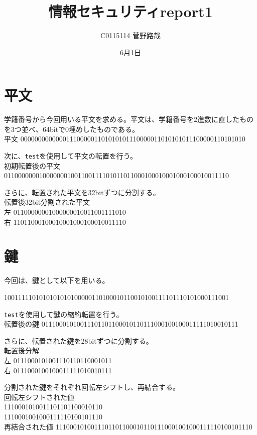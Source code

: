 \documentclass[uplatex]{jsarticle}
\title{情報セキュリティreport1}
\author{C0115114 菅野路哉}
\date{6月1日}
\begin{document}
\maketitle

\section{平文}
学籍番号から今回用いる平文を求める。平文は、学籍番号を2進数に直したものを3つ並べ、64bitで0埋めしたものである。\\
平文
0000000000000111000001101010101110000011010101011100000110101010


次に、{\tt test}を使用して平文の転置を行う。\\
初期転置後の平文
0110000000100000001001100111101011011000100010001000100010011110


さらに、転置された平文を32bitずつに分割する。\\
転置後32bit分割された平文\\
左 01100000001000000010011001111010\\
右 11011000100010001000100010011110


\section{鍵}
今回は、鍵として以下を用いる。


1001111101010101010100000110100010110010100111101110101000111001


{\tt test}を使用して鍵の縮約転置を行う。\\
転置後の鍵
01110001010011101101100010110111000100100011111010010111


さらに、転置された鍵を28bitずつに分割する。\\
転置後分解\\
左 0111000101001110110110001011\\
右 0111000100100011111010010111


分割された鍵をそれぞれ回転左シフトし、再結合する。\\
回転左シフトされた値\\
1110001010011101101100010110\\
1110001001000111110100101110\\
再結合された値
11100010100111011011000101101110001001000111110100101110
\end{document}
